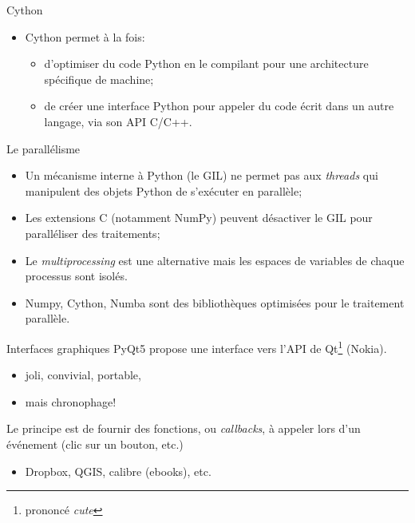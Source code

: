 \documentclass[dvipsnames]{beamer}
\begin{document}
\begin{frame}
    [fragile]{Cython}
    \begin{itemize}
        \item Cython permet à la fois:
              \begin{itemize}
                  \item d'optimiser du code Python en le compilant pour
                        une architecture spécifique de machine;
                  \item de créer une interface Python pour appeler du code écrit
                        dans un autre langage, via son API C/C++.
              \end{itemize}
    \end{itemize}
\end{frame}

\begin{frame}
    [fragile]{Le parallélisme}
    \begin{itemize}
        \item Un mécanisme interne à Python (le GIL) ne permet pas aux
              \emph{threads} qui manipulent des objets Python de s'exécuter en
              parallèle;\\
              \mbox{}\hfill\PointingHand{} \quad\mbox{}
        \item Les extensions C (notamment NumPy) peuvent désactiver le GIL pour
              paralléliser des traitements;
        \item Le \emph{multiprocessing} est une alternative mais les espaces de
              variables de chaque processus sont isolés.
              \vspace{1em}
        \item Numpy, Cython, Numba sont des bibliothèques optimisées pour le
              traitement parallèle.
    \end{itemize}

\end{frame}

\begin{frame}
    [fragile]{Interfaces graphiques}
    \alert{PyQt5} propose une interface vers l'API de Qt\footnote{prononcé
        \emph{cute}} (Nokia).
    \begin{itemize}
        \item joli, convivial, portable,
        \item mais chronophage!
    \end{itemize}
    Le principe est de fournir des fonctions, ou \emph{callbacks}, à appeler
    lors d'un événement (clic sur un bouton, etc.)

    \begin{itemize}
        \item Dropbox, QGIS, calibre (ebooks), etc.
    \end{itemize}
\end{frame}


\end{document}
